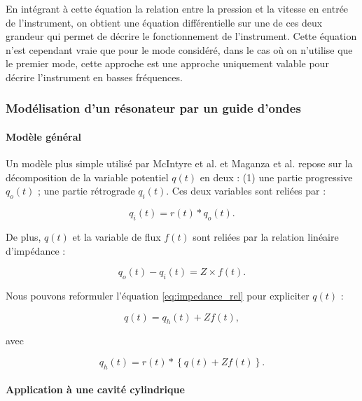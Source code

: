 \documentclass[atiam, article]{rapport} %
\begin{document}
En intégrant à cette équation la relation entre la pression et la vitesse en entrée de l'instrument, on obtient une équation différentielle sur une de ces deux grandeur qui permet de décrire le fonctionnement de l'instrument. Cette équation n'est cependant vraie que pour le mode considéré, dans le cas où on n'utilise que le premier mode, cette approche est une approche uniquement valable pour décrire l'instrument en basses fréquences. 


\subsubsection{Modélisation d'un résonateur par un guide d'ondes}

\paragraph{Modèle général}\label{sec:guide}

Un modèle plus simple utilisé par McIntyre et al. \cite{mcintyre_oscillations_1983} et Maganza et al. \cite{maganza_bifurcations_1986} repose sur la décomposition de la variable potentiel $q(t)$ en deux : (1) une partie progressive $q_o(t)$ ; une partie rétrograde $q_i(t)$. Ces deux variables sont reliées par :

\begin{equation}
    q_i(t)=r(t)*q_o(t).
\end{equation}

De plus, $q(t)$ et la variable de flux $f(t)$ sont reliées par la relation linéaire d'impédance :

\begin{equation}
    q_o(t) - q_i(t) = Z\times f(t).
    \label{eq:impedance_rel}
\end{equation}

Nous pouvons reformuler l'équation \ref{eq:impedance_rel} pour expliciter $q(t)$ :

\begin{equation}
    q(t) = q_h(t) + Zf(t), 
\end{equation}

avec

\begin{equation}
    q_h(t)=r(t)*\left\{q(t)+Zf(t)\right\}.
\end{equation}

 
\paragraph{Application à une cavité cylindrique}
\end{document}
